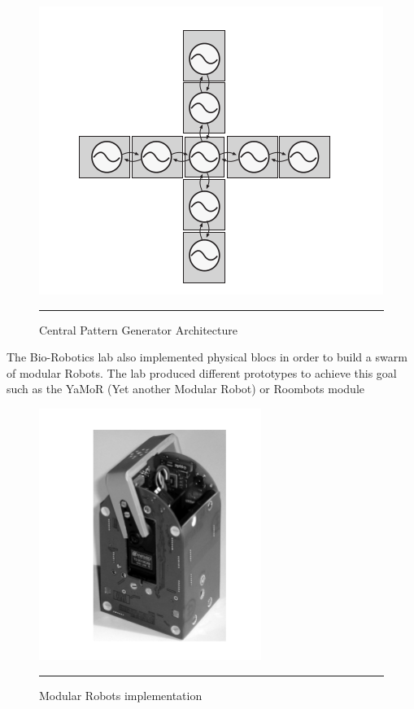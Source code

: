 \begin{figure}[htbp]
    \centering
    \includegraphics[scale=0.3]{Figures/cpg.png}
    \rule{35em}{0.5pt}
    \caption[Central Pattern Generator Architecture]{Central Pattern Generator Architecture}
    \label{fig:cpg}
\end{figure}

The Bio-Robotics lab also implemented physical blocs in order to build a swarm of modular Robots. The lab produced different prototypes to achieve this goal such as the YaMoR (Yet another Modular Robot) or Roombots module 

\begin{figure}[htbp]
    \centering
    \includegraphics[scale=0.3]{Figures/yamor.png}
    \rule{35em}{0.5pt}
    \caption[Modular Robots implementation]{Modular Robots implementation}
    \label{fig:yamor}
\end{figure}


